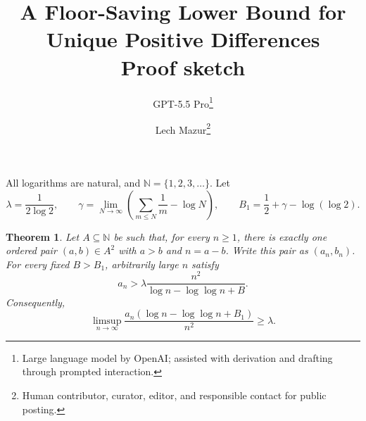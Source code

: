 \documentclass[10pt]{article}
\title{A Floor-Saving Lower Bound for Unique Positive Differences\\
\large Proof sketch}
\author{GPT-5.5 Pro\thanks{Large language model by OpenAI; assisted with derivation and drafting through prompted interaction.}
\and
Lech Mazur\thanks{Human contributor, curator, editor, and responsible contact for public posting.}}
\date{}
\newtheorem{theorem}{Theorem}
\newcommand{\N}{\mathbb N}
\begin{document}
\maketitle

All logarithms are natural, and $\N=\{1,2,3,\ldots\}$.  Let
\[
        \lambda=\frac1{2\log2},\qquad
        \gamma=
        \lim_{N\to\infty}\left(\sum_{m\le N}\frac1m-\log N\right),
        \qquad
        B_1=\frac12+\gamma-\log(\log2).
\]

\begin{theorem}
Let $A\subseteq\N$ be such that, for every $n\ge1$, there is exactly one
ordered pair $(a,b)\in A^2$ with $a>b$ and $n=a-b$.  Write this pair as
$(a_n,b_n)$.  For every fixed $B>B_1$, arbitrarily large $n$ satisfy
\[
        a_n>\lambda\frac{n^2}{\log n-\log\log n+B}.
\]
Consequently,
\[
        \limsup_{n\to\infty}
        \frac{a_n(\log n-\log\log n+B_1)}{n^2}\ge\lambda .
\]
\end{theorem}
\end{document}
